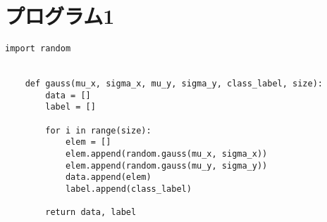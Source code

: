 \section{プログラム1}
\begin{lstlisting}[caption=課題1のデータ作成用プログラム]
    import random


    def gauss(mu_x, sigma_x, mu_y, sigma_y, class_label, size):
        data = []
        label = []

        for i in range(size):
            elem = []
            elem.append(random.gauss(mu_x, sigma_x))
            elem.append(random.gauss(mu_y, sigma_y))
            data.append(elem)
            label.append(class_label)

        return data, label
\end{lstlisting}